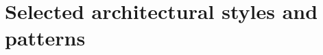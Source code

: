 \documentclass[../../DD.tex]{subfiles}
\begin{document}
\section{Selected architectural styles and patterns\label{sect:2.6}}


\newpage
\end{document}
